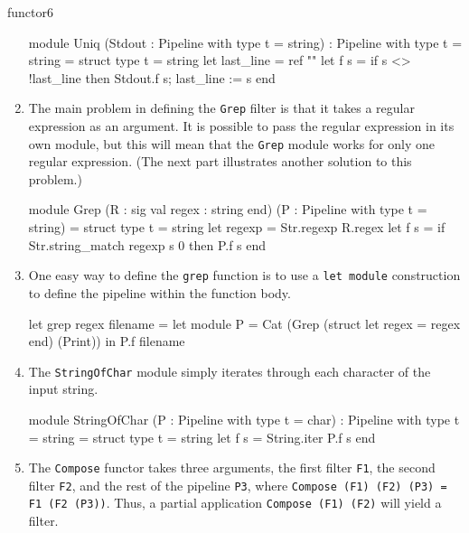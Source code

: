 \begin{exercise}{functor6}
\begin{answer}
\begin{enumerate}
\begin{ocaml}
module Uniq (Stdout : Pipeline with type t = string)
 : Pipeline with type t = string =
struct
   type t = string
   let last_line = ref "\n"
   let f s =
      if s <> !last_line then
         Stdout.f s;
      last_line := s
end
\end{ocaml}

\item

The main problem in defining the \hbox{\lstinline$Grep$} filter is
that it takes a regular expression as an argument.  It is possible to
pass the regular expression in its own module, but this will mean that
the \hbox{\lstinline$Grep$} module works for only one regular
expression.  (The next part illustrates another solution to this
problem.)

\begin{ocaml}
module Grep
 (R : sig val regex : string end)
 (P : Pipeline with type t = string) =
struct
   type t = string
   let regexp = Str.regexp R.regex
   let f s =
      if Str.string_match regexp s 0 then
         P.f s
end
\end{ocaml}

\item

One easy way to define the \hbox{\lstinline$grep$} function is to use
a \hbox{\lstinline$let module$} construction to define the pipeline
within the function body.

\begin{ocaml}
let grep regex filename =
   let module P = Cat (Grep (struct let regex = regex end) (Print)) in
   P.f filename
\end{ocaml}

\item

The \hbox{\lstinline$StringOfChar$} module simply iterates through each
character of the input string.

\begin{ocaml}
module StringOfChar (P : Pipeline with type t = char)
 : Pipeline with type t = string =
struct
   type t = string
   let f s = String.iter P.f s
end
\end{ocaml}

\item

The \hbox{\lstinline$Compose$} functor takes three arguments, the
first filter \hbox{\lstinline$F1$}, the second
filter \hbox{\lstinline$F2$}, and the rest of the
pipeline \hbox{\lstinline$P3$}, where 
\hbox{\lstinline$Compose (F1) (F2) (P3) = F1 (F2 (P3))$}.
Thus, a partial application \hbox{\lstinline$Compose (F1) (F2)$} will
yield a filter.


\end{enumerate}
\end{answer}
\end{exercise}
